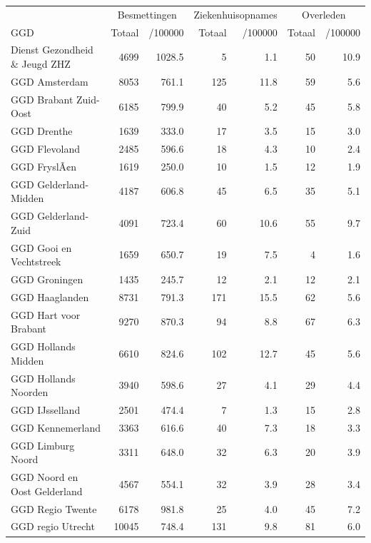 \documentclass[
  english,
  man,floatsintext]{apa6}
\begin{document}
\begin{table}[H]
\centering\begingroup\fontsize{10}{12}\selectfont

\begin{threeparttable}
\begin{tabular}{lrrrrrr}
\toprule
\multicolumn{1}{c}{ } & \multicolumn{2}{c}{Besmettingen} & \multicolumn{2}{c}{Ziekenhuisopnames} & \multicolumn{2}{c}{Overleden} \\
\cmidrule(l{3pt}r{3pt}){2-3} \cmidrule(l{3pt}r{3pt}){4-5} \cmidrule(l{3pt}r{3pt}){6-7}
GGD & Totaal & /100000 & Totaal & /100000 & Totaal & /100000\\
\midrule
Dienst Gezondheid \& Jeugd ZHZ & 4699 & 1028.5 & 5 & 1.1 & 50 & 10.9\\
GGD Amsterdam & 8053 & 761.1 & 125 & 11.8 & 59 & 5.6\\
GGD Brabant Zuid-Oost & 6185 & 799.9 & 40 & 5.2 & 45 & 5.8\\
GGD Drenthe & 1639 & 333.0 & 17 & 3.5 & 15 & 3.0\\
GGD Flevoland & 2485 & 596.6 & 18 & 4.3 & 10 & 2.4\\
GGD FryslÃ¢n & 1619 & 250.0 & 10 & 1.5 & 12 & 1.9\\
GGD Gelderland-Midden & 4187 & 606.8 & 45 & 6.5 & 35 & 5.1\\
GGD Gelderland-Zuid & 4091 & 723.4 & 60 & 10.6 & 55 & 9.7\\
GGD Gooi en Vechtstreek & 1659 & 650.7 & 19 & 7.5 & 4 & 1.6\\
GGD Groningen & 1435 & 245.7 & 12 & 2.1 & 12 & 2.1\\
GGD Haaglanden & 8731 & 791.3 & 171 & 15.5 & 62 & 5.6\\
GGD Hart voor Brabant & 9270 & 870.3 & 94 & 8.8 & 67 & 6.3\\
GGD Hollands Midden & 6610 & 824.6 & 102 & 12.7 & 45 & 5.6\\
GGD Hollands Noorden & 3940 & 598.6 & 27 & 4.1 & 29 & 4.4\\
GGD IJsselland & 2501 & 474.4 & 7 & 1.3 & 15 & 2.8\\
GGD Kennemerland & 3363 & 616.6 & 40 & 7.3 & 18 & 3.3\\
GGD Limburg Noord & 3311 & 648.0 & 32 & 6.3 & 20 & 3.9\\
GGD Noord en Oost Gelderland & 4567 & 554.1 & 32 & 3.9 & 28 & 3.4\\
GGD Regio Twente & 6178 & 981.8 & 25 & 4.0 & 45 & 7.2\\
GGD regio Utrecht & 10045 & 748.4 & 131 & 9.8 & 81 & 6.0\\

\end{tabular}
\end{threeparttable}
\end{table}
\end{document}
